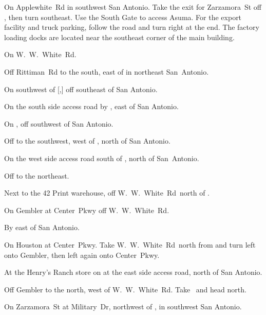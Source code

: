 
\newcommand*{\WWWhiteRd}{W\!.~W\!.~White~Rd}

\begin{LocationList}

On Applewhite~Rd in southwest San Antonio.
Take the exit for Zarzamora~St off , then turn southeast.
Use the South Gate to access Asuma.
For the export facility and truck parking, follow the road and turn right at the end.
The factory loading docks are located near the southeast corner of the main building.

\Location{\GarageHQ \Garage}
On  \WWWhiteRd.

Off Rittiman~Rd to the south, east of  in northeast San~Antonio.

On  southwest of [,] off  southeast of San Antonio.

On the south side  access road by , east of San Antonio.

On , off  southwest of San Antonio.

Off  to the southwest, west of , north of San Antonio.

On the west side  access road south of , north of San~Antonio.

Off   to the northeast.

Next to the 42 Print warehouse, off  \WWWhiteRd\ north of  .

\Location{\RecruitmentAgency \Recruitment}
On Gembler at Center~Pkwy off  \WWWhiteRd.

\Location{\TruckStop \Gas \Rest \Service \Weigh}
By   east of San Antonio.

On Houston at Center~Pkwy.
Take  \WWWhiteRd\ north from   and turn left onto Gembler, then left again onto Center~Pkwy.

At the Henry's Ranch store on  at the east side  access road, north of San Antonio.

Off Gembler to the north, west of  \WWWhiteRd.
Take~  and head north.

On Zarzamora~St at  Military~Dr, northwest of  , in southwest San Antonio.

\end{LocationList}

